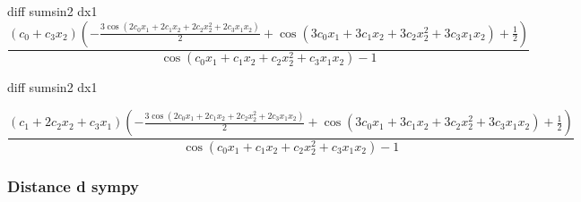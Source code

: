 \documentclass[10pt,a4paper]{article}
\begin{document}
diff sumsin2 dx1
\begin{equation}
\frac{\left(c_{0} + c_{3} x_{2}\right) \left(- \frac{3 \cos{\left (2 c_{0} x_{1} + 2 c_{1} x_{2} + 2 c_{2} x_{2}^{2} + 2 c_{3} x_{1} x_{2} \right )}}{2} + \cos{\left (3 c_{0} x_{1} + 3 c_{1} x_{2} + 3 c_{2} x_{2}^{2} + 3 c_{3} x_{1} x_{2} \right )} + \frac{1}{2}\right)}{\cos{\left (c_{0} x_{1} + c_{1} x_{2} + c_{2} x_{2}^{2} + c_{3} x_{1} x_{2} \right )} - 1}
\end{equation}

diff sumsin2 dx1

\begin{equation}
\frac{\left(c_{1} + 2 c_{2} x_{2} + c_{3} x_{1}\right) \left(- \frac{3 \cos{\left (2 c_{0} x_{1} + 2 c_{1} x_{2} + 2 c_{2} x_{2}^{2} + 2 c_{3} x_{1} x_{2} \right )}}{2} + \cos{\left (3 c_{0} x_{1} + 3 c_{1} x_{2} + 3 c_{2} x_{2}^{2} + 3 c_{3} x_{1} x_{2} \right )} + \frac{1}{2}\right)}{\cos{\left (c_{0} x_{1} + c_{1} x_{2} + c_{2} x_{2}^{2} + c_{3} x_{1} x_{2} \right )} - 1}
\end{equation}



\subsubsection{Distance d sympy}
\end{document}
